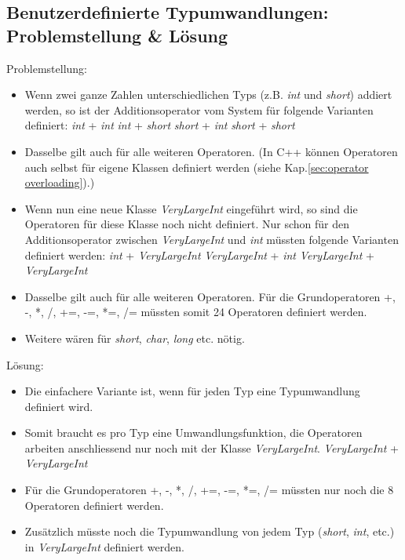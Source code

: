 \subsection{Benutzerdefinierte Typumwandlungen: Problemstellung \& Lösung}
Problemstellung:
\begin{itemize}
	\item Wenn zwei ganze Zahlen unterschiedlichen Typs (z.B. \emph{int} und \emph{short}) addiert werden, so ist der Additionsoperator vom System für folgende Varianten definiert:
	\subitem \emph{int} + \emph{int}
	\subitem \emph{int} + \emph{short}
	\subitem \emph{short} + \emph{int}
	\subitem \emph{short} + \emph{short}
	\item Dasselbe gilt auch für alle weiteren Operatoren. (In C++ können Operatoren auch selbst für eigene Klassen definiert werden (siehe Kap.\ref{sec:operator overloading}).)
	\item Wenn nun eine neue Klasse \emph{VeryLargeInt} eingeführt wird, so sind die Operatoren für diese Klasse noch nicht definiert. Nur schon für den Additionsoperator zwischen \emph{VeryLargeInt} und \emph{int} müssten folgende Varianten definiert werden:
	\subitem \emph{int} + \emph{VeryLargeInt}
	\subitem \emph{VeryLargeInt} + \emph{int}
	\subitem \emph{VeryLargeInt} + \emph{VeryLargeInt}
	\item Dasselbe gilt auch für alle weiteren Operatoren. Für die Grundoperatoren +, -, *, /, +=, -=, *=, /= müssten somit 24 Operatoren definiert werden.
	\item Weitere wären für \emph{short}, \emph{char}, \emph{long} etc. nötig.
\end{itemize}
Lösung:
\begin{itemize}
	\item Die einfachere Variante ist, wenn für jeden Typ eine Typumwandlung definiert wird.
	\item Somit braucht es pro Typ eine Umwandlungsfunktion, die Operatoren arbeiten anschliessend nur noch mit der Klasse \emph{VeryLargeInt}.
	\subitem \emph{VeryLargeInt} + \emph{VeryLargeInt}
	\item Für die Grundoperatoren +, -, *, /, +=, -=, *=, /= müssten nur noch die 8 Operatoren definiert werden.
	\item Zusätzlich müsste noch die Typumwandlung von jedem Typ (\emph{short}, \emph{int}, etc.) in \emph{VeryLargeInt} definiert werden. 
\end{itemize}

